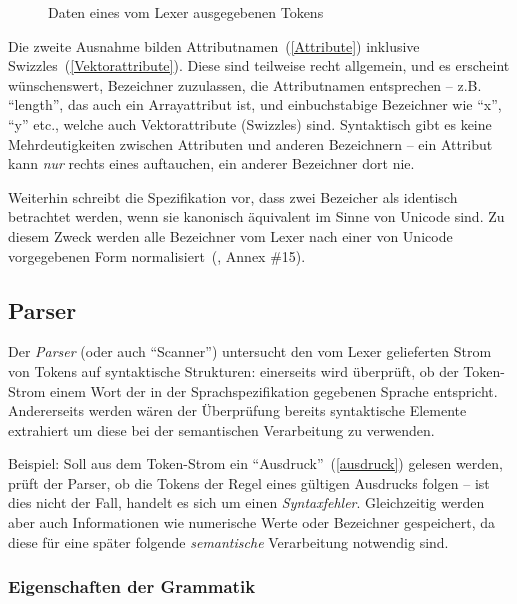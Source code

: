 \documentclass[twoside,a4paper,fleqn,12pt]{article}
\begin{document}
\begin{figure}[h]
   \centering
  
  \caption{Daten eines vom Lexer ausgegebenen Tokens}
  \label{fig:LexerToken}
\end{figure}

Die zweite Ausnahme bilden Attributnamen~(\ref{Attribute}) inklusive Swizzles~(\ref{Vektorattribute}). Diese sind teilweise recht allgemein, und
es erscheint wünschenswert, Bezeichner zuzulassen, die Attributnamen entsprechen -- z.B. ``length'', das auch ein Arrayattribut ist, und einbuchstabige
Bezeichner wie ``x'', ``y'' etc., welche auch Vektorattribute (Swizzles) sind. Syntaktisch gibt es keine Mehrdeutigkeiten zwischen Attributen und
anderen Bezeichnern -- ein Attribut kann \emph{nur} rechts eines  auftauchen, ein anderer Bezeichner dort nie.

Weiterhin schreibt die Spezifikation vor, dass zwei Bezeicher als identisch betrachtet werden, wenn sie kanonisch äquivalent im Sinne von Unicode sind.
Zu diesem Zweck werden alle Bezeichner vom Lexer nach einer von Unicode vorgegebenen Form normalisiert~(\cite{unicode}, Annex \#15).

\subsection{Parser}

Der \emph{Parser} (oder auch "`Scanner"') untersucht den vom Lexer gelieferten Strom von Tokens auf syntaktische Strukturen:
einerseits wird überprüft, ob der Token-Strom einem Wort der in der Sprachspezifikation gegebenen Sprache entspricht.
Andererseits werden wären der Überprüfung bereits syntaktische Elemente extrahiert um diese bei der semantischen Verarbeitung zu
verwenden.

Beispiel: Soll aus dem Token-Strom ein "`Ausdruck"'~(\ref{ausdruck}) gelesen werden, prüft der Parser, ob die Tokens der Regel eines gültigen
Ausdrucks folgen -- ist dies nicht der Fall, handelt es sich um einen \emph{Syntaxfehler}.
Gleichzeitig werden aber auch Informationen wie numerische Werte oder Bezeichner gespeichert, da diese für eine später folgende
\emph{semantische} Verarbeitung notwendig sind.


\subsubsection{Eigenschaften der Grammatik}
\end{document}
